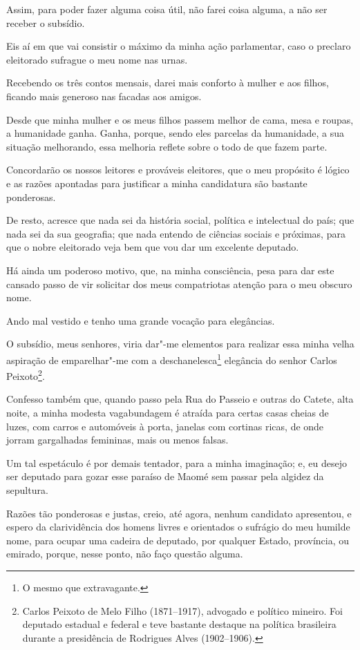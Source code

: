 Assim, para poder fazer alguma coisa útil, não farei coisa alguma, a
não ser receber o subsídio.

Eis aí em que vai consistir o máximo da minha ação parlamentar, caso o
preclaro eleitorado sufrague o meu nome nas urnas.

Recebendo os três contos mensais, darei mais conforto à mulher e aos
filhos, ficando mais generoso nas facadas aos amigos.

Desde que minha mulher e os meus filhos passem melhor de cama, mesa e
roupas, a humanidade ganha. Ganha, porque, sendo eles parcelas da
humanidade, a sua situação melhorando, essa melhoria reflete sobre o
todo de que fazem parte.

Concordarão os nossos leitores e prováveis eleitores, que o meu
propósito é lógico e as razões apontadas para justificar a minha
candidatura são bastante ponderosas.

De resto, acresce que nada sei da história social, política e
intelectual do país; que nada sei da sua geografia; que nada entendo de
ciências sociais e próximas, para que o nobre eleitorado veja bem que
vou dar um excelente deputado.

Há ainda um poderoso motivo, que, na minha consciência, pesa para dar
este cansado passo de vir solicitar dos meus compatriotas atenção para o
meu obscuro nome.

Ando mal vestido e tenho uma grande vocação para elegâncias.

O subsídio, meus senhores, viria dar"-me elementos para realizar essa
minha velha aspiração de emparelhar"-me com a deschanelesca\footnote{O
  mesmo que extravagante.} elegância do senhor Carlos Peixoto\footnote{Carlos
  Peixoto de Melo Filho (1871--1917), advogado e político mineiro. Foi
  deputado estadual e federal e teve bastante destaque na política
  brasileira durante a presidência de Rodrigues Alves (1902--1906).}.

Confesso também que, quando passo pela Rua do Passeio e outras do
Catete, alta noite, a minha modesta vagabundagem é atraída para certas
casas cheias de luzes, com carros e automóveis à porta, janelas com
cortinas ricas, de onde jorram gargalhadas femininas, mais ou menos
falsas.

Um tal espetáculo é por demais tentador, para a minha imaginação; e, eu
desejo ser deputado para gozar esse paraíso de Maomé sem passar pela
algidez da sepultura.

Razões tão ponderosas e justas, creio, até agora, nenhum candidato
apresentou, e espero da clarividência dos homens livres e orientados o
sufrágio do meu humilde nome, para ocupar uma cadeira de deputado, por
qualquer Estado, província, ou emirado, porque, nesse ponto, não faço
questão alguma.

